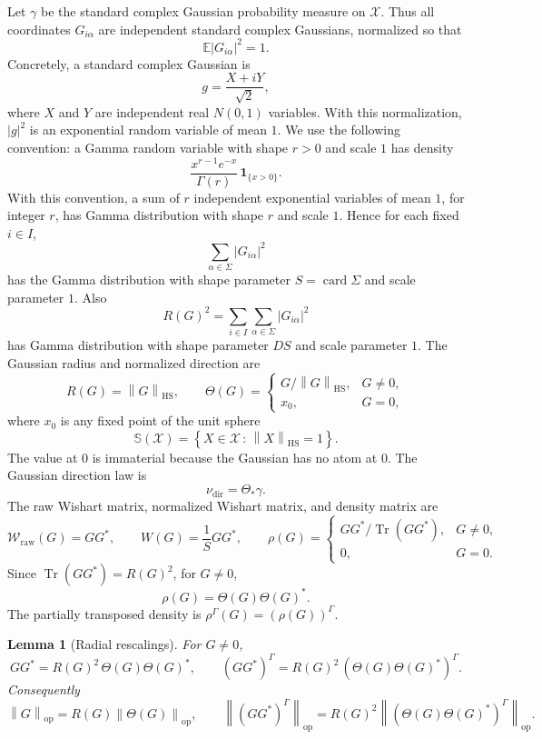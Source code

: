 \documentclass[11pt,oneside]{book}
\newtheorem{lemma}[theorem]{Lemma}
\DeclareMathOperator{\Tr}{Tr}
\DeclareMathOperator{\card}{card}
\newcommand{\E}{\mathbb E}
\newcommand{\1}{\mathbf 1}
\newcommand{\Sphere}{\mathbb S}
\newcommand{\pt}{\Gamma}
\newcommand{\HS}{\mathrm{HS}}
\newcommand{\op}{\mathrm{op}}
\newcommand{\norm}[1]{\left\|#1\right\|}
\newcommand{\set}[1]{\left\{#1\right\}}
\newcommand{\given}{\,:\,}
\begin{document}
Let \(\gamma\) be the standard complex Gaussian probability measure on
\(\mathcal X\).  Thus all coordinates \(G_{i\alpha}\) are independent standard
complex Gaussians, normalized so that
\[
  \E |G_{i\alpha}|^2=1.
\]
Concretely, a standard complex Gaussian is
\[
  g=\frac{X+iY}{\sqrt2},
\]
where \(X\) and \(Y\) are independent real \(N(0,1)\) variables.  With this
normalization, \(|g|^2\) is an exponential random variable of mean \(1\).
We use the following convention: a Gamma random variable with shape \(r>0\)
and scale \(1\) has density
\[
  \frac{x^{r-1}e^{-x}}{\Gamma(r)}\,\1_{\{x>0\}}.
\]
With this convention, a sum of \(r\) independent exponential variables of mean
\(1\), for integer \(r\), has Gamma distribution with shape \(r\) and scale
\(1\).  Hence
for each fixed \(i\in I\),
\[
  \sum_{\alpha\in\Sigma}|G_{i\alpha}|^2
\]
has the Gamma distribution with shape parameter \(S=\card\Sigma\) and scale
parameter \(1\).  Also
\[
  R(G)^2=\sum_{i\in I}\sum_{\alpha\in\Sigma}|G_{i\alpha}|^2
\]
has Gamma distribution with shape parameter \(DS\) and scale parameter \(1\).
The Gaussian radius and normalized direction are
\[
  R(G)=\norm G_{\HS},\qquad
  \Theta(G)=
  \begin{cases}
    G/\norm G_{\HS},&G\ne 0,\\
    x_0,&G=0,
  \end{cases}
\]
where \(x_0\) is any fixed point of the unit sphere
\[
  \Sphere(\mathcal X)=\set{X\in\mathcal X\given \norm X_{\HS}=1}.
\]
The value at \(0\) is immaterial because the Gaussian has no atom at \(0\).
The Gaussian direction law is
\[
  \nu_{\mathrm{dir}}=\Theta_*\gamma .
\]
The raw Wishart matrix, normalized Wishart matrix, and density matrix are
\[
  \mathcal W_{\mathrm{raw}}(G)=GG^*,\qquad
  W(G)=\frac1S GG^*,\qquad
  \rho(G)=
  \begin{cases}
    GG^*/\Tr(GG^*),&G\ne0,\\
    0,&G=0.
  \end{cases}
\]
Since \(\Tr(GG^*)=R(G)^2\), for \(G\ne0\),
\[
  \rho(G)=\Theta(G)\Theta(G)^* .
\]
The partially transposed density is \(\rho^\pt(G)=(\rho(G))^\pt\).

\begin{lemma}[Radial rescalings]
For \(G\ne0\),
\[
  GG^*=R(G)^2\,\Theta(G)\Theta(G)^*,\qquad
  (GG^*)^\pt=R(G)^2\,(\Theta(G)\Theta(G)^*)^\pt.
\]
Consequently
\[
  \norm{G}_{\op}=R(G)\norm{\Theta(G)}_{\op},\qquad
  \norm{(GG^*)^\pt}_{\op}
  =R(G)^2\norm{(\Theta(G)\Theta(G)^*)^\pt}_{\op}.
\]
\end{lemma}
\end{document}
